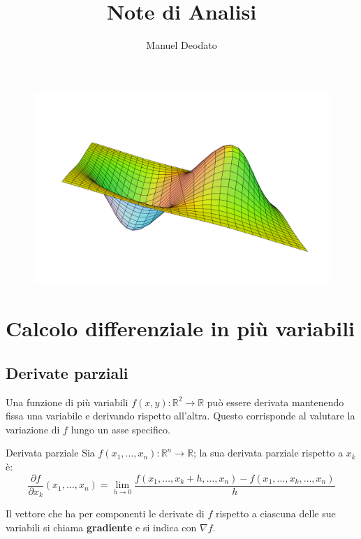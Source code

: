 \documentclass[11pt, a4paper]{scrartcl}
\title{Note di Analisi}
\author{Manuel Deodato}
\date{}
\theoremstyle{definition}
\numberwithin{esempio}{section}
\theoremstyle{definition}
\numberwithin{obs}{section}
\numberwithin{nota}{section}
\renewcommand{\maketitle}{
\begin{center}
{\sffamily
{\fontsize{20}{20}\selectfont\MakeUppercase\thetitle}}

\vspace{0.2in}

{\large\scshape\sffamily\theauthor}
\end{center}
}
\numberwithin{equation}{subsection}
\begin{document}
\maketitle
\vspace{9cm}
\begin{figure}[h!]
	\centering
	\includegraphics[width=1\columnwidth]{front.png}
\end{figure}
\newpage
\tableofcontents 
\newpage
\section{Calcolo differenziale in pi\`u variabili}
\subsection{Derivate parziali}

Una funzione di pi\`u variabili $f(x,y):\mathbb{R}^2 \to \mathbb{R}$ pu\`o essere derivata mantenendo fissa una variabile e derivando rispetto all'altra. Questo corrisponde al valutare la variazione di $f$ lungo un asse specifico.
\begin{definizione}
	{Derivata parziale}{}
	Sia $f(x_1,\ldots,x_n) :\mathbb{R}^n \to \mathbb{R}$; la sua derivata parziale rispetto a $x_k$ \`e:
	\begin{equation}
		\frac{\partial f}{\partial x_k}(x_1,\ldots,x_n) = \lim_{h \to 0} \frac{f(x_1,\ldots,x_k + h, \ldots, x_n)-f(x_1,\ldots,x_k,\ldots,x_n)}{h}
	\end{equation}
\end{definizione}
\noindent Il vettore che ha per componenti le derivate di $f$ rispetto a ciascuna delle sue variabili si chiama \textbf{gradiente} e si indica con $\nabla f$.
\end{document}
